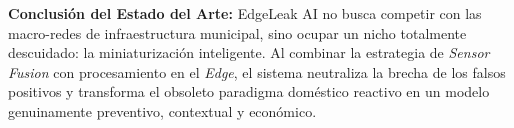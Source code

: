 \documentclass[11pt,a4paper]{article}
\begin{document}
\textbf{Conclusión del Estado del Arte:} 
EdgeLeak AI no busca competir con las macro-redes de infraestructura municipal, sino ocupar un nicho totalmente descuidado: la miniaturización inteligente. Al combinar la estrategia de \textit{Sensor Fusion} con procesamiento en el \textit{Edge}, el sistema neutraliza la brecha de los falsos positivos y transforma el obsoleto paradigma doméstico reactivo en un modelo genuinamente preventivo, contextual y económico.
\end{document}
